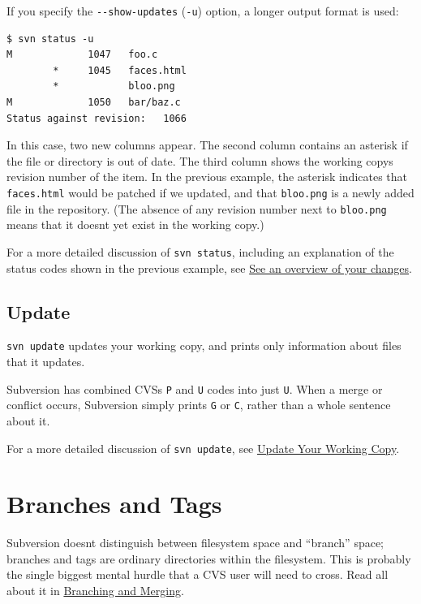 If you specify the \texttt{-\/-show-updates} (\texttt{-u}) option, a
longer output format is used:

\begin{verbatim}
$ svn status -u
M             1047   foo.c
        *     1045   faces.html
        *            bloo.png
M             1050   bar/baz.c
Status against revision:   1066
\end{verbatim}

In this case, two new columns appear. The second column contains an
asterisk if the file or directory is out of date. The third column shows
the working copy\textquotesingle s revision number of the item. In the
previous example, the asterisk indicates that \texttt{faces.html} would
be patched if we updated, and that \texttt{bloo.png} is a newly added
file in the repository. (The absence of any revision number next to
\texttt{bloo.png} means that it doesn\textquotesingle t yet exist in the
working copy.)

For a more detailed discussion of \texttt{svn\ status}, including an
explanation of the status codes shown in the previous example, see
\hyperref[svn.tour.cycle.examine.status]{See an overview of your
changes}.

\subsection{Update}\label{svn.forcvs.status-vs-update.update}

\texttt{svn\ update} updates your working copy, and prints only
information about files that it updates.

Subversion has combined CVS\textquotesingle s \texttt{P} and \texttt{U}
codes into just \texttt{U}. When a merge or conflict occurs, Subversion
simply prints \texttt{G} or \texttt{C}, rather than a whole sentence
about it.

For a more detailed discussion of \texttt{svn\ update}, see
\hyperref[svn.tour.cycle.update]{Update Your Working Copy}.

\section{Branches and Tags}\label{svn.forcvs.branches-and-tags}

Subversion doesn\textquotesingle t distinguish between filesystem space
and ``branch'' space; branches and tags are ordinary directories within
the filesystem. This is probably the single biggest mental hurdle that a
CVS user will need to cross. Read all about it in
\hyperref[svn.branchmerge]{Branching and Merging}.


